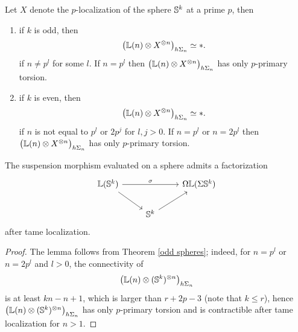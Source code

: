  
 \begin{theorem}
 	\cite[Theorem 3.13, Theorem 4.4]{Arone-Mahowald}
 	\label{odd spheres}
 	Let $X$ denote the $p$-localization of the sphere ${\mathbb{S}}^k$ at a prime $p$, then
 	\begin{enumerate}
 		\item if $k$ is odd, then 
 			$$
 			\big({\mathbb{L}}(n)\otimes X^{\otimes n}
 			\big)_{h\Sigma_n}
 			\simeq *.
 			$$
 			if $n\neq p^l$ for some $l$.
 			If $n=p^l$ then $\big({\mathbb{L}}(n)\otimes X^{\otimes n}
 			\big)_{h\Sigma_n}$ has only $p$-primary torsion.
 		\item if $k$ is even, then 
 			$$
 			\big({\mathbb{L}}(n)\otimes X^{\otimes n}
 			\big)_{h\Sigma_n}
 			\simeq *.
 			$$
 			if $n$ is not equal to $p^l$ or $2p^j$ for $l, j>0$.
 			If $n=p^l$ or $n = 2p^l$ then $\big({\mathbb{L}}(n)\otimes X^{\otimes n}
 			\big)_{h\Sigma_n}$ has only $p$-primary torsion.
 	\end{enumerate} 	
 \end{theorem}
 \begin{lemma}
 
 	The suspension morphism evaluated on a sphere admits a factorization
\[
\begin{tikzcd}
	 \BL(\BS^{k}) &   &  \Omega \BL (\Sigma \BS^{k})\\
	& \BS^{k}  &
	\arrow[from=1-1, to = 1-3, "\sigma"]
	\arrow[from=1-1 , to =2-2]
	\arrow[from=2-2, to=1-3]
\end{tikzcd}
\]
after tame localization.
\end{lemma}
\begin{proof}
	The lemma follows from Theorem \ref{odd spheres}; indeed, for $n=p^l$ or $n=2p^l$ and $l>0$, the connectivity of
	\[
	\big(
	{\mathbb{L}}(n)\otimes ({\mathbb{S}}^{k})^{\otimes n}
	\big)_{h\Sigma_n}
	\]
	is at least $kn-n+1$, which is larger than $r+2p-3$ (note that $k\leq r$), hence 
	$\big(
	{\mathbb{L}}(n)\otimes ({\mathbb{S}}^{k})^{\otimes n}
	\big)_{h\Sigma_n}$ has only $p$-primary torsion and is contractible after tame localization for $n>1$.
	\end{proof}

